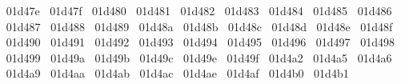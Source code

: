 {  ^^^^^^01d47e%
  ^^^^^^01d47f%
  ^^^^^^01d480%
  ^^^^^^01d481%
  ^^^^^^01d482%
  ^^^^^^01d483%
  ^^^^^^01d484%
  ^^^^^^01d485%
  ^^^^^^01d486%
  ^^^^^^01d487%
  ^^^^^^01d488%
  ^^^^^^01d489%
  ^^^^^^01d48a%
  ^^^^^^01d48b%
  ^^^^^^01d48c%
  ^^^^^^01d48d%
  ^^^^^^01d48e%
  ^^^^^^01d48f%
  ^^^^^^01d490%
  ^^^^^^01d491%
  ^^^^^^01d492%
  ^^^^^^01d493%
  ^^^^^^01d494%
  ^^^^^^01d495%
  ^^^^^^01d496%
  ^^^^^^01d497%
  ^^^^^^01d498%
  ^^^^^^01d499%
  ^^^^^^01d49a%
  ^^^^^^01d49b%
  ^^^^^^01d49c%
  ^^^^^^01d49e%
  ^^^^^^01d49f%
  ^^^^^^01d4a2%
  ^^^^^^01d4a5%
  ^^^^^^01d4a6%
  ^^^^^^01d4a9%
  ^^^^^^01d4aa%
  ^^^^^^01d4ab%
  ^^^^^^01d4ac%
  ^^^^^^01d4ae%
  ^^^^^^01d4af%
  ^^^^^^01d4b0%
  ^^^^^^01d4b1%
}
